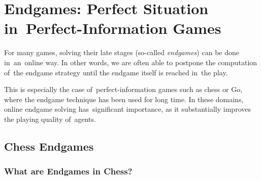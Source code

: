 \chapter{Endgames: Perfect Situation in~Perfect-Information Games}

For many games, solving their late stages (so-called \emph{endgames}) can be done in~an~online way.
In other words, we are often able to postpone the computation of~the endgame strategy until the endgame itself is reached in~the play.

This is especially the case of~perfect-information games such as chess or Go, where the endgame technique has been used for long time.
In these domains, online endgame solving has~significant importance, as it substantially improves the playing quality of~agents.

\section{Chess Endgames}

\subsection{What are Endgames in Chess?}


